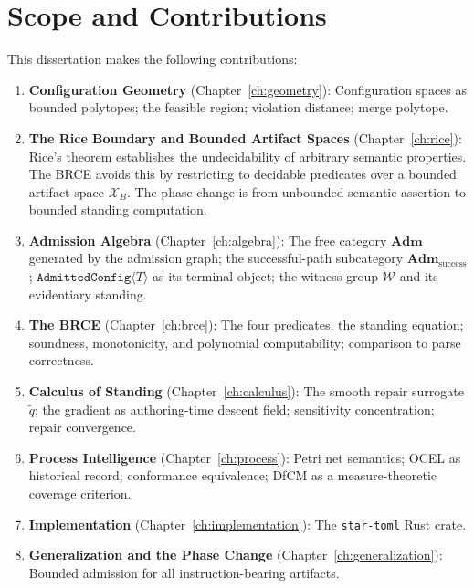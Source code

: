 \documentclass[12pt, letterpaper]{report}
\theoremstyle{plain}
\theoremstyle{definition}
\theoremstyle{remark}
\newcommand{\W}{\mathcal{W}}
\begin{document}
\section{Scope and Contributions}

This dissertation makes the following contributions:

\begin{enumerate}
  \item \textbf{Configuration Geometry} (Chapter~\ref{ch:geometry}):
        Configuration spaces as bounded polytopes; the feasible region;
        violation distance; merge polytope.

  \item \textbf{The Rice Boundary and Bounded Artifact Spaces}
        (Chapter~\ref{ch:rice}):
        Rice's theorem establishes the undecidability of arbitrary semantic
        properties. The BRCE avoids this by restricting to decidable
        predicates over a bounded artifact space $\mathcal{X}_B$.
        The phase change is from unbounded semantic assertion to bounded
        standing computation.

  \item \textbf{Admission Algebra} (Chapter~\ref{ch:algebra}):
        The free category $\mathbf{Adm}$ generated by the admission graph;
        the successful-path subcategory $\mathbf{Adm}_{\mathrm{success}}$;
        $\texttt{AdmittedConfig}\langle T\rangle$ as its terminal object;
        the witness group $\W$ and its evidentiary standing.

  \item \textbf{The BRCE} (Chapter~\ref{ch:brce}):
        The four predicates; the standing equation; soundness, monotonicity,
        and polynomial computability; comparison to parse correctness.

  \item \textbf{Calculus of Standing} (Chapter~\ref{ch:calculus}):
        The smooth repair surrogate $\tilde{q}$; the gradient as authoring-time
        descent field; sensitivity concentration; repair convergence.

  \item \textbf{Process Intelligence} (Chapter~\ref{ch:process}):
        Petri net semantics; OCEL as historical record; conformance equivalence;
        DfCM as a measure-theoretic coverage criterion.

  \item \textbf{Implementation} (Chapter~\ref{ch:implementation}):
        The \texttt{star-toml} Rust crate.

  \item \textbf{Generalization and the Phase Change}
        (Chapter~\ref{ch:generalization}):
        Bounded admission for all instruction-bearing artifacts.
\end{enumerate}
\end{document}
